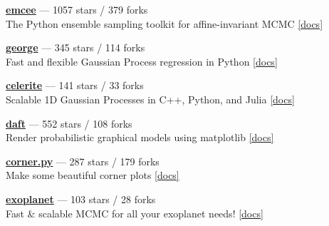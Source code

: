 \item \href{https://github.com/dfm/emcee}{{\bf emcee}} --- 1057 stars / 379 forks \\
The Python ensemble sampling toolkit for affine-invariant MCMC \href{https://emcee.readthedocs.io}{[docs]}

\item \href{https://github.com/dfm/george}{{\bf george}} --- 345 stars / 114 forks \\
Fast and flexible Gaussian Process regression in Python \href{http://george.readthedocs.io}{[docs]}

\item \href{https://github.com/dfm/celerite}{{\bf celerite}} --- 141 stars / 33 forks \\
Scalable 1D Gaussian Processes in C++, Python, and Julia \href{http://celerite.rtfd.io}{[docs]}

\item \href{https://github.com/daft-dev/daft}{{\bf daft}} --- 552 stars / 108 forks \\
Render probabilistic graphical models using matplotlib \href{https://docs.daft-pgm.org}{[docs]}

\item \href{https://github.com/dfm/corner.py}{{\bf corner.py}} --- 287 stars / 179 forks \\
Make some beautiful corner plots \href{http://corner.readthedocs.io}{[docs]}

\item \href{https://github.com/exoplanet-dev/exoplanet}{{\bf exoplanet}} --- 103 stars / 28 forks \\
Fast {\&} scalable MCMC for all your exoplanet needs!  \href{https://docs.exoplanet.codes}{[docs]}